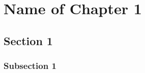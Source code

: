 \documentclass[12pt,a4paper]{book}
\title{}
\author{Branden Glass}
\date{} %
\begin{document}
\maketitle
\tableofcontents

\chapter{Name of Chapter 1}

\section{Section 1}
\subsection{Subsection 1}
\end{document}
